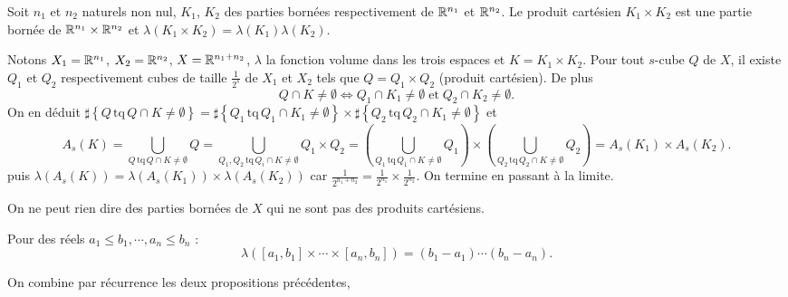 \begin{propn}
 Soit $n_1$ et $n_2$ naturels non nul, $K_1$, $K_2$ des parties bornées respectivement de $\mathbb{R}^{n_1}$ et $\mathbb{R}^{n_2}$. Le produit cartésien $K_1\times K_2$ est une partie bornée de  $\mathbb{R}^{n_1} \times \mathbb{R}^{n_2}$ et $\lambda(K_1\times K_2)=\lambda(K_1)\lambda( K_2)$.
\end{propn}
\begin{demo}
Notons $X_1=\mathbb{R}^{n_1}$, $X_2=\mathbb{R}^{n_2}$, $X=\mathbb{R}^{n_1 + n_2}$, $\lambda$ la fonction volume dans les trois espaces et $K=K_1 \times K_2$. Pour tout $s$-cube $Q$ de $X$, il existe $Q_1$ et $Q_2$ respectivement cubes de taille $\frac{1}{2^s}$ de $X_1$ et $X_2$ tels que $Q=Q_1 \times Q_2$ (produit cartésien). De plus
\begin{displaymath}
 Q \cap K \neq \emptyset \Leftrightarrow Q_1 \cap K_1 \neq \emptyset \; \mathrm{ et } \; Q_2 \cap K_2 \neq \emptyset .
\end{displaymath}
On en déduit
$\sharp \left\lbrace Q \,\mathrm{tq}\, Q \cap K \neq \emptyset \right\rbrace =
\sharp \left\lbrace Q_1 \,\mathrm{tq}\, Q_1 \cap K_1 \neq \emptyset \right\rbrace
\times
\sharp \left\lbrace Q_2 \,\mathrm{tq}\, Q_2 \cap K_1 \neq \emptyset \right\rbrace$
et
\begin{displaymath}
 A_s(K) = \bigcup_{Q \,\mathrm{tq}\, Q \cap K \neq \emptyset} Q = \bigcup_{Q_1, Q_2 \,\mathrm{tq}\, Q_i \cap K \neq \emptyset} Q_1\times Q_2
 = \left( \bigcup_{Q_1 \,\mathrm{tq}\, Q_1 \cap K \neq \emptyset} Q_1\right) \times \left( \bigcup_{Q_2 \,\mathrm{tq}\, Q_2 \cap K \neq \emptyset} Q_2\right)
 = A_s(K_1) \times A_s(K_2).
\end{displaymath}
puis $\lambda(A_s(K)) = \lambda(A_s(K_1))\times \lambda(A_s(K_2))$ car $\frac{1}{2^{n_1+n_2}}=\frac{1}{2^{n_1}}\times \frac{1}{2^{n_2}}$. On termine en passant à la limite.
\end{demo}
On ne peut rien dire des parties bornées de $X$ qui ne sont pas des produits cartésiens.
\begin{propn}
Pour des réels $a_1 \leq b_1, \cdots , a_n \leq b_n$ :
\begin{displaymath}
 \lambda([a_1,b_1]\times \cdots \times [a_n,b_n]) = (b_1-a_1) \cdots (b_n-a_n).
\end{displaymath}
\end{propn}
\begin{demo}
On combine par récurrence les deux propositions précédentes,
\end{demo}

